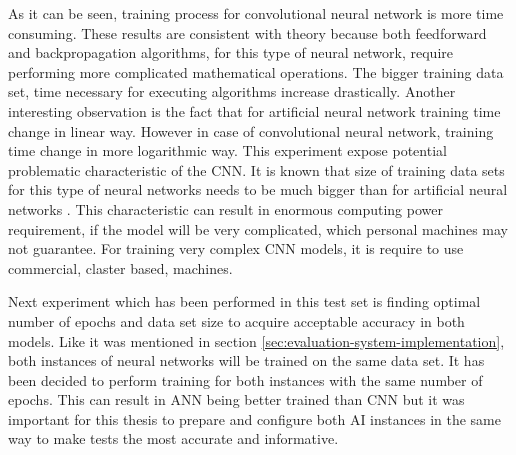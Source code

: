 As it can be seen, training process for convolutional neural network is more time consuming. These results are consistent with theory because both feedforward and backpropagation algorithms, for this type of neural network, require performing more complicated mathematical operations. The bigger training data set, time necessary for executing algorithms increase drastically. Another interesting observation is the fact that for artificial neural network training time change in linear way. However in case of convolutional neural network, training time change in more logarithmic way. This experiment expose potential problematic characteristic of the CNN. It is known that size of training data sets for this type of neural networks needs to be much bigger than for artificial neural networks \cite{bib:book-deep-learning-practitioner-approach,bib:book-generative-deep-learning}. This characteristic can result in enormous computing power requirement, if the model will be very complicated, which personal machines may not guarantee. For training very complex CNN models, it is require to use commercial, claster based, machines.

Next experiment which has been performed in this test set is finding optimal number of epochs and data set size to acquire acceptable accuracy in both models. Like it was mentioned in section \ref{sec:evaluation-system-implementation}, both instances of neural networks will be trained on the same data set. It has been decided to perform training for both instances with the same number of epochs. This can result in ANN being better trained than CNN but it was important for this thesis to prepare and configure both AI instances in the same way to make tests the most accurate and informative.

